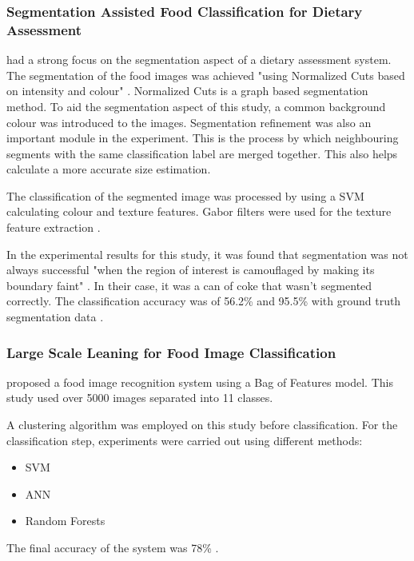 \subsubsection*{Segmentation Assisted Food Classification for Dietary Assessment}
\textcite{zhu2011segmentation} had a strong focus on the segmentation aspect of a dietary assessment system.
The segmentation of the food images was achieved "using Normalized Cuts based on intensity and colour" \textcite{zhu2011segmentation}.
Normalized Cuts is a graph based segmentation method.
To aid the segmentation aspect of this study, a common background colour was introduced to the images.
Segmentation refinement was also an important module in the experiment.
This is the process by which neighbouring segments with  the same classification label are merged together.
This also helps calculate a more accurate size estimation.

The classification of the segmented image was processed by using a SVM calculating colour and texture features.
Gabor filters were used for the texture feature extraction \textcite{zhu2011segmentation}.

In the experimental results for this study, it was found that segmentation was not always successful "when the region of interest is camouflaged by making its boundary faint" \textcite{zhu2011segmentation}. In their case, it was a can of coke that wasn't segmented correctly.
The classification accuracy was of 56.2\% and 95.5\% with ground truth segmentation data \textcite{zhu2011segmentation}.

\subsubsection*{Large Scale Leaning for Food Image Classification}
\textcite{LSL_2015} proposed a food image recognition system using a Bag of Features model.
This study used over 5000 images separated into 11 classes.

A clustering algorithm was employed on this study before classification.
For the classification step, experiments were carried out using different methods:
\begin{itemize}
	\item{SVM}
	\item{ANN}
	\item{Random Forests}
\end{itemize}

The final accuracy of the system was 78\% \textcite{LSL_2015}.

